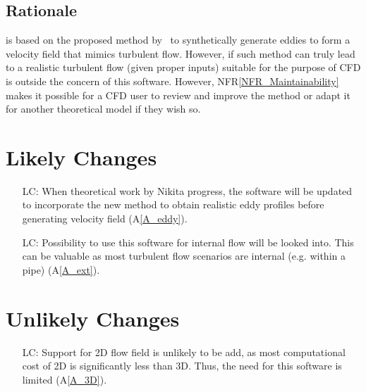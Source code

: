 \documentclass[12pt]{article}
\newcommand{\aref}[1]{A\ref{#1}}
\newcommand{\nfrref}[1]{NFR\ref{#1}}
\newcounter{lcnum} %
\begin{document}
\subsection{Rationale}

\progname{} is based on the proposed method by~\citet{PolettoEtAl2013} to synthetically generate eddies to form a velocity field that mimics turbulent flow. However, if such method can truly lead to a realistic turbulent flow (given proper inputs) suitable for the purpose of CFD is outside the concern of this software. However, \nfrref{NFR_Maintainability} makes it possible for a CFD user to review and improve the method or adapt it for another theoretical model if they wish so. 


\section{Likely Changes}    

\noindent \begin{itemize}

\item[LC\refstepcounter{lcnum}\thelcnum\label{LC_realEddy}:] When theoretical work by Nikita progress, the software will be updated to incorporate the new method to obtain realistic eddy profiles before generating velocity field (\aref{A_eddy}).
\item[LC\refstepcounter{lcnum}\thelcnum\label{LC_internal}:] Possibility to use this software for internal flow will be looked into. This can be valuable as most turbulent flow scenarios are internal (e.g. within a pipe) (\aref{A_ext}).

\end{itemize}

\section{Unlikely Changes}    

\noindent \begin{itemize}

\item[LC\refstepcounter{lcnum}\thelcnum\label{LC_2D}:] Support for 2D flow field is unlikely to be add, as most computational cost of 2D is significantly less than 3D. Thus, the need for this software is limited (\aref{A_3D}).

\end{itemize}
\end{document}

